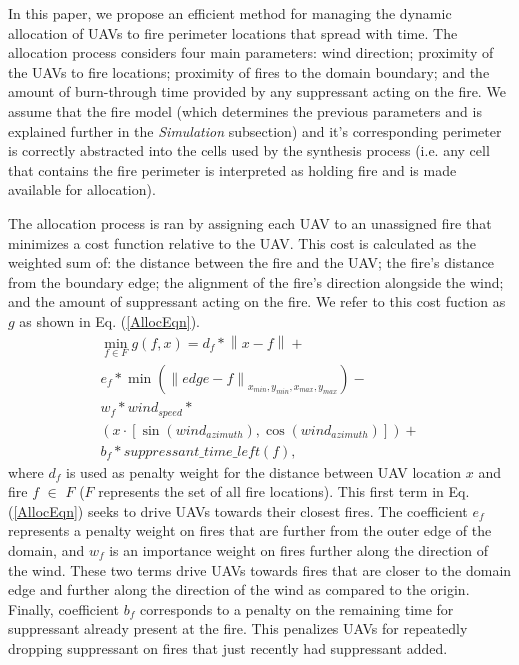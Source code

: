 \documentclass{ieeeaccess}
\newcommand{\norm}[1]{\left\lVert#1\right\rVert}
\begin{document}
In this paper, we propose an efficient method for managing the dynamic allocation of UAVs to fire perimeter locations that spread with time. The allocation process considers four main parameters: wind direction; proximity of the UAVs to fire locations; proximity of fires to the domain boundary; and the amount of burn-through time provided by any suppressant acting on the fire. We assume that the fire model (which determines the previous parameters and is explained further in the \textit{Simulation} subsection) and it's corresponding perimeter is correctly abstracted into the cells used by the synthesis process (i.e. any cell that contains the fire perimeter is interpreted as holding fire and is made available for allocation).

The allocation process is ran by assigning each UAV to an unassigned fire that minimizes a cost function relative to the UAV. This cost is calculated as the weighted sum of: the distance between the fire and the UAV; the fire's distance from the boundary edge; the alignment of the fire's direction alongside the wind; and the amount of suppressant acting on the fire. We refer to this cost fuction as $g$ as shown in Eq. (\ref{AllocEqn}).
\begin{equation}
\label{AllocEqn}
\begin{aligned}
\min_{f\in F} g(f,x) = d_{f}*\norm{x-f} + \\ e_f*\min(\norm{edge - f}_{x_{min}, y_{min}, x_{max}, y_{max}}) - \\ w_f*wind_{speed}* \\ (x \cdot [\sin(wind_{azimuth}), \cos(wind_{azimuth})])+\\ b_f*suppressant\_time\_left(f),
\end{aligned}
\end{equation}
where $d_{f}$ is used as penalty weight for the distance between UAV location $x$ and fire $f$ $\in$ $F$ ($F$ represents the set of all fire locations). This first term in Eq. (\ref{AllocEqn}) seeks to drive UAVs towards their closest fires. The coefficient $e_f$ represents a penalty weight on fires that are further from the outer edge of the domain, and $w_f$ is an importance weight on fires further along the direction of the wind. These two terms drive UAVs towards fires that are closer to the domain edge and further along the direction of the wind as compared to the origin. Finally, coefficient $b_{f}$ corresponds to a penalty on the remaining time for suppressant already present at the fire. This penalizes UAVs for repeatedly dropping suppressant on fires that just recently had suppressant added.
\end{document}
